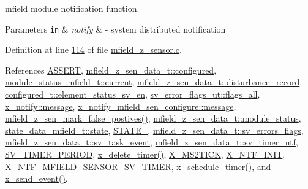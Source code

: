 mfield module notification function. 


\begin{DoxyParams}[1]{Parameters}
\mbox{\tt in}  & {\em notify} & -\/ system distributed notification \\
\hline
\end{DoxyParams}


Definition at line \hyperlink{a00053_source_l00114}{114} of file \hyperlink{a00053_source}{mfield\+\_\+z\+\_\+sensor.\+c}.



References \hyperlink{a00072_source_l00059}{A\+S\+S\+E\+R\+T}, \hyperlink{a00027_source_l00038}{mfield\+\_\+z\+\_\+sen\+\_\+data\+\_\+t\+::configured}, \hyperlink{a00019_source_l00108}{module\+\_\+status\+\_\+mfield\+\_\+t\+::current}, \hyperlink{a00027_source_l00043}{mfield\+\_\+z\+\_\+sen\+\_\+data\+\_\+t\+::disturbance\+\_\+record}, \hyperlink{a00021_source_l00205}{configured\+\_\+t\+::element\+\_\+status\+\_\+sv\+\_\+en}, \hyperlink{a00022_source_l00044}{sv\+\_\+error\+\_\+flags\+\_\+ut\+::flags\+\_\+all}, \hyperlink{a00036_source_l00075}{x\+\_\+notify\+::message}, \hyperlink{a00019_ae926905663cb8ca01f1bc2d670e428f5}{x\+\_\+notify\+\_\+mfield\+\_\+sen\+\_\+configure\+::message}, \hyperlink{a00053_source_l00747}{mfield\+\_\+z\+\_\+sen\+\_\+mark\+\_\+false\+\_\+postives()}, \hyperlink{a00027_source_l00047}{mfield\+\_\+z\+\_\+sen\+\_\+data\+\_\+t\+::module\+\_\+status}, \hyperlink{a00019_source_l00103}{state\+\_\+data\+\_\+mfield\+\_\+t\+::state}, \hyperlink{a00021_source_l00149}{S\+T\+A\+T\+E\+\_}, \hyperlink{a00027_source_l00053}{mfield\+\_\+z\+\_\+sen\+\_\+data\+\_\+t\+::sv\+\_\+errors\+\_\+flags}, \hyperlink{a00027_source_l00031}{mfield\+\_\+z\+\_\+sen\+\_\+data\+\_\+t\+::sv\+\_\+task\+\_\+event}, \hyperlink{a00027_source_l00034}{mfield\+\_\+z\+\_\+sen\+\_\+data\+\_\+t\+::sv\+\_\+timer\+\_\+ntf}, \hyperlink{a00023_source_l00020}{S\+V\+\_\+\+T\+I\+M\+E\+R\+\_\+\+P\+E\+R\+I\+O\+D}, \hyperlink{a00037_source_l00482}{x\+\_\+delete\+\_\+timer()}, \hyperlink{a00036_source_l00048}{X\+\_\+\+M\+S2\+T\+I\+C\+K}, \hyperlink{a00036_source_l00030}{X\+\_\+\+N\+T\+F\+\_\+\+I\+N\+I\+T}, \hyperlink{a00025_source_l00015}{X\+\_\+\+N\+T\+F\+\_\+\+M\+F\+I\+E\+L\+D\+\_\+\+S\+E\+N\+S\+O\+R\+\_\+\+S\+V\+\_\+\+T\+I\+M\+E\+R}, \hyperlink{a00037_source_l00456}{x\+\_\+schedule\+\_\+timer()}, and \hyperlink{a00037_source_l00381}{x\+\_\+send\+\_\+event()}.


